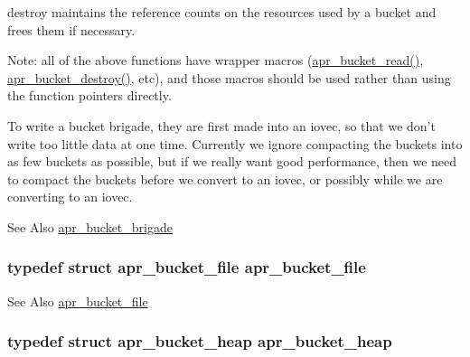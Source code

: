 destroy maintains the reference counts on the resources used by a bucket and frees them if necessary.

Note\-: all of the above functions have wrapper macros (\hyperlink{group___a_p_r___util___bucket___brigades_gae44ae938c6c60e148430fdb098dcf28f}{apr\-\_\-bucket\-\_\-read()}, \hyperlink{group___a_p_r___util___bucket___brigades_gafc0dae1e90a798284ed777a0c9e90ec6}{apr\-\_\-bucket\-\_\-destroy()}, etc), and those macros should be used rather than using the function pointers directly.

To write a bucket brigade, they are first made into an iovec, so that we don't write too little data at one time. Currently we ignore compacting the buckets into as few buckets as possible, but if we really want good performance, then we need to compact the buckets before we convert to an iovec, or possibly while we are converting to an iovec.\begin{DoxySeeAlso}{See Also}
\hyperlink{structapr__bucket__brigade}{apr\-\_\-bucket\-\_\-brigade} 
\end{DoxySeeAlso}
\hypertarget{group___a_p_r___util___bucket___brigades_ga1a786f7edac4d7a2c212f0fe74457b3d}{
\subsubsection[{apr\-\_\-bucket\-\_\-file}]{\setlength{\rightskip}{0pt plus 5cm}typedef struct {\bf apr\-\_\-bucket\-\_\-file} {\bf apr\-\_\-bucket\-\_\-file}}}\label{group___a_p_r___util___bucket___brigades_ga1a786f7edac4d7a2c212f0fe74457b3d}
\begin{DoxySeeAlso}{See Also}
\hyperlink{structapr__bucket__file}{apr\-\_\-bucket\-\_\-file} 
\end{DoxySeeAlso}
\hypertarget{group___a_p_r___util___bucket___brigades_gaede6e77d621d0f3f7d2685d489d01283}{
\subsubsection[{apr\-\_\-bucket\-\_\-heap}]{\setlength{\rightskip}{0pt plus 5cm}typedef struct {\bf apr\-\_\-bucket\-\_\-heap} {\bf apr\-\_\-bucket\-\_\-heap}}}\label{group___a_p_r___util___bucket___brigades_gaede6e77d621d0f3f7d2685d489d01283}
